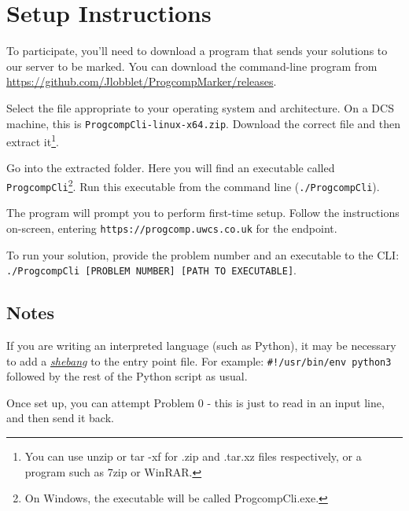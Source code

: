 \section*{Setup Instructions}

To participate, you'll need to download a program that sends your solutions to our server to be marked.
You can download the command-line program from \url{https://github.com/Jlobblet/ProgcompMarker/releases}.

Select the file appropriate to your operating system and architecture.
On a DCS machine, this is \verb|ProgcompCli-linux-x64.zip|.
Download the correct file and then extract it\footnote{You can use {\ttfamily unzip} or {\ttfamily tar -xf} for {\ttfamily .zip} and {\ttfamily .tar.xz} files respectively, or a program such as 7zip or WinRAR.}.

Go into the extracted folder.
Here you will find an executable called \verb|ProgcompCli|\footnote{On Windows, the executable will be called {\ttfamily ProgcompCli.exe}.}.
Run this executable from the command line (\verb|./ProgcompCli|).

The program will prompt you to perform first-time setup.
Follow the instructions on-screen, entering \verb|https://progcomp.uwcs.co.uk| for the endpoint.

To run your solution, provide the problem number and an executable to the CLI: \verb|./ProgcompCli [PROBLEM NUMBER] [PATH TO EXECUTABLE]|.


\subsection*{Notes}

If you are writing an interpreted language (such as Python), it may be necessary to add a \href{https://en.wikipedia.org/wiki/Shebang_(Unix)}{\em shebang} to the entry point file.
For example: \verb|#!/usr/bin/env python3| followed by the rest of the Python script as usual.

Once set up, you can attempt Problem 0 - this is just to read in an input line, and then send it back.
